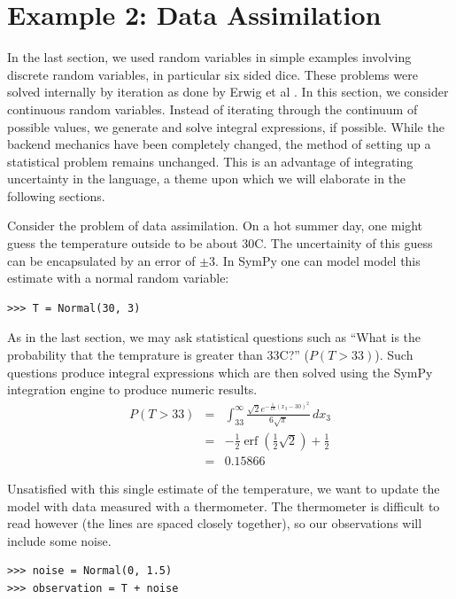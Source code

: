 \section{Example 2: Data Assimilation}

In the last section, we used random variables in simple examples involving
discrete random variables, in particular six sided dice. These problems were
solved internally by iteration as done by Erwig et al \cite{Erwig2006}. In this
section, we consider continuous random variables. Instead of iterating through
the continuum of possible values, we generate and solve integral expressions,
if possible. While the backend mechanics have been completely changed, the
method of setting up a statistical problem remains unchanged. This is an
advantage of integrating uncertainty in the language, a theme upon which we
will elaborate in the following sections.

Consider the problem of data assimilation. On a hot summer day, one might guess
the temperature outside to be about 30C. The uncertainity of this guess can be
encapsulated by an error of $\pm3$. In SymPy one can model model this estimate
with a normal random variable:

\begin{lstlisting}
>>> T = Normal(30, 3)
\end{lstlisting}

As in the last section, we may ask statistical questions such as ``What is the
probability that the temprature is greater than 33C?'' ($P(T>33)$). Such
questions produce integral expressions which are then solved using the SymPy
integration engine to produce numeric results.
\begin{eqnarray*}
P(T>33) & = & \int_{33}^{\infty} \frac{\sqrt{2} e^{- \frac{1}{18} \left(x_{3} -30\right)^{2}}}{6 \sqrt{\pi}}\, dx_{3} \\
& = & - \frac{1}{2} \operatorname{erf}{\left (\frac{1}{2} \sqrt{2} \right )} + \frac{1}{2} \\
& = & 0.15866
\end{eqnarray*}

Unsatisfied with this single estimate of the temperature, we want to update the
model with data measured with a thermometer. The thermometer is difficult to
read however (the lines are spaced closely together), so our observations will
include some noise.

\begin{lstlisting}
>>> noise = Normal(0, 1.5)
>>> observation = T + noise
\end{lstlisting}

